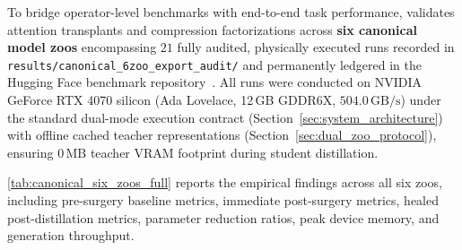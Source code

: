 To bridge operator-level benchmarks with end-to-end task performance, \neuralops{} validates attention transplants and compression factorizations across \textbf{six canonical model zoos} encompassing $21$ fully audited, physically executed runs recorded in \texttt{results/canonical\_6zoo\_export\_audit/} and permanently ledgered in the Hugging Face benchmark repository~\cite{neuralops_results_hf}. All runs were conducted on NVIDIA GeForce RTX 4070 silicon (Ada Lovelace, 12\,GB GDDR6X, $504.0\,\text{GB/s}$) under the standard dual-mode execution contract (Section~\ref{sec:system_architecture}) with offline cached teacher representations (Section~\ref{sec:dual_zoo_protocol}), ensuring $0\,\text{MB}$ teacher VRAM footprint during student distillation.

\cref{tab:canonical_six_zoos_full} reports the empirical findings across all six zoos, including pre-surgery baseline metrics, immediate post-surgery metrics, healed post-distillation metrics, parameter reduction ratios, peak device memory, and generation throughput.

